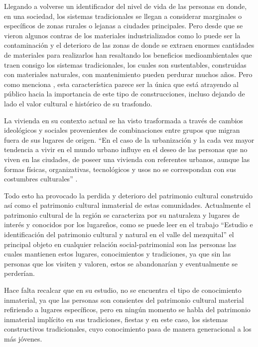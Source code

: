 Llegando a volverse un identificador del nivel de vida de las personas en donde, en una sociedad, los sistemas tradicionales se llegan a considerar marginales o específicos de zonas rurales o lejanas a ciudades principales. Pero desde que se vieron algunos contras de los materiales industrializados como lo puede ser la contaminación y el deterioro de las zonas de donde se extraen enormes cantidades de materiales para realizarlos han resaltando los beneficios medioambientales que traen consigo los sistemas tradicionales, los cuales son sustentables, construidas con materiales naturales, con mantenimiento pueden perdurar muchos años. Pero como menciona \citep{gandara2000}, esta característica parece ser la única que está atrayendo al público hacia la importancia de este tipo de construcciones, incluso dejando de lado el valor cultural e histórico de su trasfondo.

La vivienda en su contexto actual se ha visto trasformada a través de cambios ideológicos y sociales provenientes de combinaciones entre grupos que migran fuera de sus lugares de origen. ``En el caso de la urbanización y la cada vez mayor tendencia a vivir en el mundo urbano influye en el deseo de las personas que no viven en las ciudades, de poseer una vivienda con referentes urbanos, aunque las formas físicas, organizativas, tecnológicos y usos no se correspondan con sus costumbres culturales'' \citep{alvarez2003maguey}.

Todo esto ha provocado la perdida y deterioro del patrimonio cultural construido así como el patrimonio cultural inmaterial de estas comunidades. Actualmente el patrimonio cultural de la región se caracteriza por su naturaleza y lugares de interés y conocidos por los lugareños, como se puede leer en el trabajo ``Estudio e identificación del patrimonio cultural y natural en el valle del mezquital''\citep{rodriguezestudio} el principal objeto en cualquier relación social-patrimonial son las personas las cuales mantienen estos lugares, conocimientos y tradiciones, ya que sin las personas que los visiten y valoren, estos se abandonarían y eventualmente se perderían.

Hace falta recalcar que en su estudio, no se encuentra el tipo de conocimiento inmaterial, ya que las personas son consientes del patrimonio cultural material refiriendo a lugares específicos, pero en ningún momento se habla del patrimonio inmaterial implícito en sus tradiciones, fiestas y en este caso, los sistemas constructivos tradicionales, cuyo conocimiento pasa de manera generacional a los más jóvenes.
